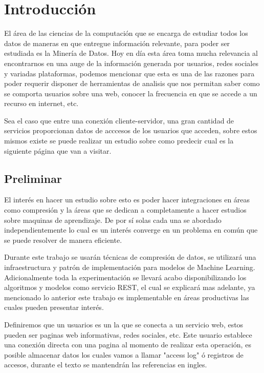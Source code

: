 \chapter[Introducción]{Introducción}
\label{ch:intro}

{
	El área de las ciencias de la computación que se encarga de estudiar todos los datos de maneras en que entregue información relevante, para poder ser estudiada es la Minería de Datos. Hoy en día esta área toma mucha relevancia al encontrarnos en una auge de la información generada por usuarios, redes sociales y variadas plataformas, podemos mencionar que esta es una de las razones para poder requerir disponer de herramientas de analisis que nos permitan saber como se comporta usuarios sobre una web, conocer la frecuencia en que se accede a un recurso en internet, etc.
	
	Sea el caso que entre una conexión cliente-servidor, una gran cantidad de servicios proporcionan datos de acccesos de los usuarios que acceden, sobre estos mismos existe se puede realizar un estudio sobre como predecir cual es la siguiente página que van a visitar.
	}


\section{Preliminar} \label{sec:preliminar}

  El interés en hacer un estudio sobre esto es poder hacer integraciones en áreas como compresión y la áreas que se dedican a completamente a hacer estudios sobre maquinas de aprendizaje. De por sí solas cada una se abordado independientemente lo cual es un interés converge en un problema en común que se puede resolver de manera eficiente.

  Durante este trabajo se usarán técnicas de compresión de datos, se utilizará una infraestructura y patrón de implementación para modelos de Machine Learning. Adicionalmente toda la experimentación se llevará acabo disponibilizando los algoritmos y modelos como servicio REST, el cual se explicará mas adelante, ya mencionado lo anterior este trabajo es implementable en áreas productivas las cuales pueden presentar interés.

  Definiremos que un usuarios es un la que se conecta a un servicio web, estos pueden ser paginas web informativas, redes sociales, etc. Este usuario establece una conexión directa con una pagina al momento de realizar esta operación, es posible almacenar datos los cuales vamos a llamar "access log" ó registros de accesos, durante el texto se mantendrán las referencias en ingles.


